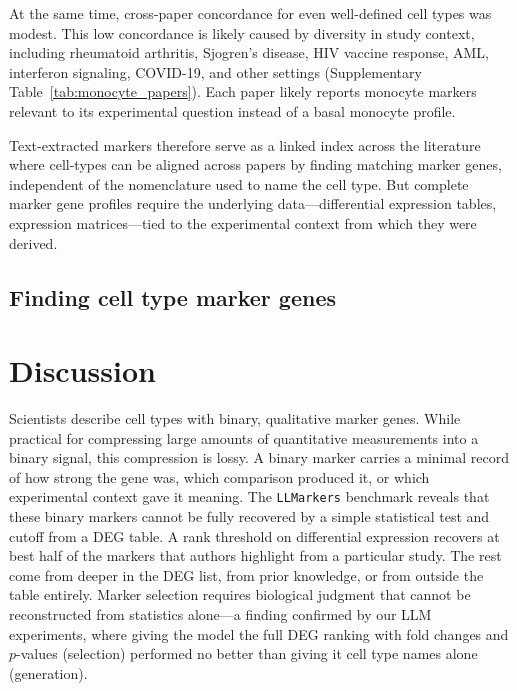 \documentclass[10pt,twocolumn]{article}
\theoremstyle{plain}
\theoremstyle{definition}
\theoremstyle{remark}
\begin{document}
At the same time, cross-paper concordance for even well-defined cell types was modest.  This low concordance is likely caused by diversity in study context, including rheumatoid arthritis, Sjogren's disease, HIV vaccine response, AML, interferon signaling, COVID-19, and other settings (Supplementary Table~\ref{tab:monocyte_papers}). Each paper likely reports monocyte markers relevant to its experimental question instead of a basal monocyte profile. 

Text-extracted markers therefore serve as a linked index across the literature where cell-types can be aligned across papers by finding matching marker genes, independent of the nomenclature used to name the cell type. But complete marker gene profiles require the underlying data---differential expression tables, expression matrices---tied to the experimental context from which they were derived.

\subsection{Finding cell type marker genes}


\balance
\section{Discussion}

Scientists describe cell types with binary, qualitative marker genes. While practical for compressing large amounts of quantitative measurements into a binary signal, this compression is lossy. A binary marker carries a minimal record of how strong the gene was, which comparison produced it, or which experimental context gave it meaning. The \texttt{LLMarkers} benchmark reveals that these binary markers cannot be fully recovered by a simple statistical test and cutoff from a DEG table. A rank threshold on differential expression recovers at best half of the markers that authors highlight from a particular study. The rest come from deeper in the DEG list, from prior knowledge, or from outside the table entirely. Marker selection requires biological judgment that cannot be reconstructed from statistics alone---a finding confirmed by our LLM experiments, where giving the model the full DEG ranking with fold changes and $p$-values (selection) performed no better than giving it cell type names alone (generation).
\end{document}
